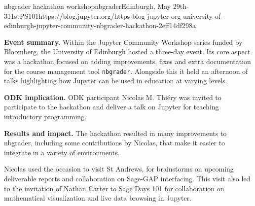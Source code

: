 \begin{event}{nbgrader hackathon workshop}{nbgrader}{Edinburgh, May
    29th-311st}{PS}{10}{1}{https://blog.jupyter.org/https-blog-jupyter-org-university-of-edinburgh-jupyter-community-nbgrader-hackathon-2eff14df298a}

  \textbf{Event summary.} Within the Jupyter Community Workshop series
  funded by Bloomberg, the University of Edinburgh hosted a three-day
  event. Its core aspect was a hackathon focused on adding
  improvements, fixes and extra documentation for the course
  management tool \texttt{nbgrader}. Alongside this it held an
  afternoon of talks highlighting how Jupyter can be used in education
  at varying levels.

  \textbf{ODK implication.} ODK participant Nicolas M. Thiéry was
  invited to participate to the hackathon and deliver a talk on
  Jupyter for teaching introductory programming.

  \textbf{Results and impact.} The hackathon resulted in many
  improvements to nbgrader, including some contributions by Nicolas,
  that make it easier to integrate in a variety of environments.

  Nicolas used the occasion to visit St Andrews, for brainstorms on
  upcoming deliverable reports and collaboration on Sage-GAP
  interfacing. This visit also led to the invitation of Nathan Carter
  to Sage Days 101 for collaboration on mathematical visualization and
  live data browsing in Jupyter.
\end{event}

